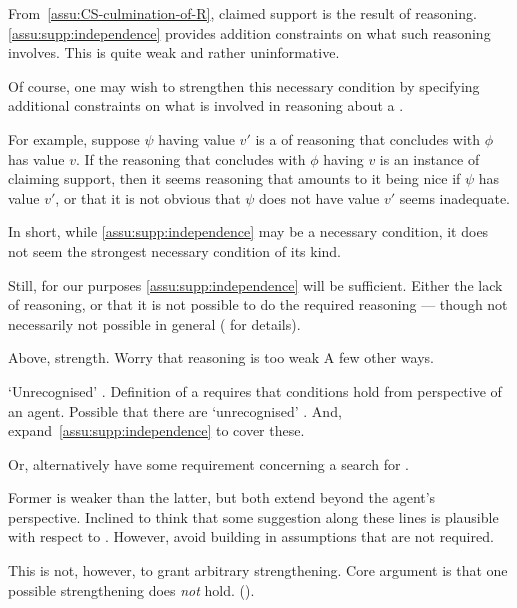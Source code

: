 \begin{note}
  From~\autoref{assu:CS-culmination-of-R}, claimed support is the result of reasoning.
  \autoref{assu:supp:independence} provides addition constraints on what such reasoning involves.
  This is quite weak and rather uninformative.
\end{note}

\begin{note}[Strengthen?]
  Of course, one may wish to strengthen this necessary condition by specifying additional constraints on what is involved in reasoning about a \requ{}.

  For example, suppose \(\psi\) having value \(v'\) is a \requ{} of reasoning that concludes with \(\phi\) has value \(v\).
  If the reasoning that concludes with \(\phi\) having \(v\) is an instance of claiming support, then it seems reasoning that amounts to it being nice if \(\psi\) has value \(v'\), or that it is not obvious that \(\psi\) does not have value \(v'\) seems inadequate.

  In short, while \autoref{assu:supp:independence} may be a necessary condition, it does not seem the strongest necessary condition of its kind.

  Still, for our purposes \autoref{assu:supp:independence} will be sufficient.
  Either the lack of reasoning, or that it is not possible to do the required reasoning --- though not necessarily not possible in general (\nI{} for details).
\end{note}

\begin{note}
  Above, strength.
  Worry that reasoning is too weak
  A few other ways.

  `Unrecognised' .
  Definition of a \requ{} requires that conditions hold from perspective of an agent.
  Possible that there are `unrecognised' .
  And, expand~\autoref{assu:supp:independence} to cover these.

  Or, alternatively have some requirement concerning a search for .

  Former is weaker than the latter, but both extend beyond the agent's perspective.
  Inclined to think that some suggestion along these lines is plausible with respect to \ideaCSB{}.
  However, avoid building in assumptions that are not required.

  This is not, however, to grant arbitrary strengthening.
  Core argument is that one possible strengthening does \emph{not} hold. (\ESU{}).
\end{note}

